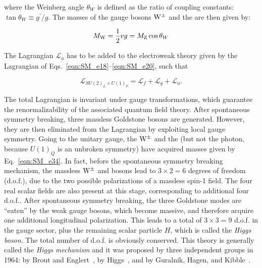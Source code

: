 \noindent where the Weinberg angle $\theta_W$ is defined as the ratio of coupling constants: $\tan\theta_W \equiv g^\prime/g$.
The masses of the gauge bosons $\mathrm{W}^\pm$ and the \PZ are then given by:

\begin{equation}\label{eqn:SM_e34}
M_\mathrm{W} = \frac{1}{2}vg = M_\mathrm{Z} \cos\theta_W
\end{equation}

The Lagrangian $\mathcal{L}_\phi$ has to be added to the electroweak theory given by the Lagrangian of Eqs.~\ref{eqn:SM_e18}--\ref{eqn:SM_e20}, such that

\begin{equation}\label{eqn:SM_e35}
\mathcal{L}_{SU(2)_L \times U(1)_Y} = \mathcal{L}_f + \mathcal{L}_g + \mathcal{L}_\phi.
\end{equation}

The total Lagrangian is invariant under gauge transformations, which guarantee the renormalizability of the associated quantum field theory.
After spontaneous symmetry breaking, three massless Goldstone bosons are generated. However, they are then eliminated from the Lagrangian by exploiting local gauge symmetry.
Going to the unitary gauge, the $\mathrm{W}^\pm$ and the \PZ (but not the photon, because $U(1)_Q$ is an unbroken symmetry) have acquired masses given by Eq.~\ref{eqn:SM_e34}.
In fact, before the spontaneous symmetry breaking mechanism, the massless $\mathrm{W}^\pm$ and \PZ bosons lead to $3\times2 = 6$ degrees of freedom (d.o.f.), due to the two possible polarizations of a massless spin-1 field.
The four real scalar fields are also present at this stage, corresponding to additional four d.o.f..
After spontaneous symmetry breaking, the three Goldstone modes are ``eaten'' by the weak gauge bosons, which become massive, and therefore acquire one additional longitudinal polarization.
This leads to a total of $3 \times 3 = 9$ d.o.f. in the gauge sector, plus the remaining scalar particle $H$, which is called the \textit{Higgs boson}. The total number of d.o.f. is obviously conserved.
This theory is generally called the \textit{Higgs mechanism} and it was proposed by three independent groups in 1964: by Brout and Englert~\cite{PhysRevLett.13.321}, by Higgs~\cite{Higgs1964132,PhysRevLett.13.508,PhysRev.145.1156}, and by Guralnik, Hagen, and Kibble~\cite{PhysRevLett.13.585}.

